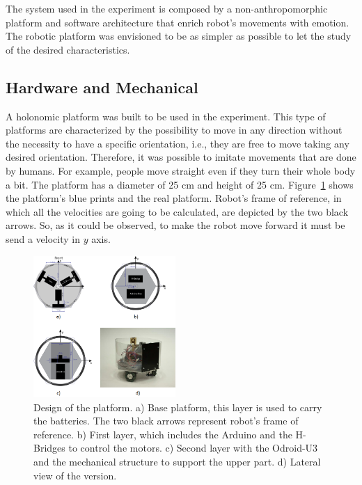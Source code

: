 
The system used in the experiment is composed by a non-anthropomorphic platform and software architecture that enrich robot's movements with emotion. The robotic platform was envisioned to be as simpler as possible to let the study of the desired characteristics. 

\subsection{Hardware and Mechanical}

A holonomic platform was built to be used in the experiment. This type of platforms are characterized by the possibility to move in any direction without the necessity to have a specific orientation, i.e., they are free to move taking any desired orientation. Therefore, it was possible to imitate movements that are done by humans. For example, people move straight even if they turn their whole body a bit. The platform has a diameter of 25 cm and height of 25 cm. Figure~\ref{fig:ThirdDesign} shows the platform's blue prints and the real platform. Robot's frame of reference, in which all the velocities are going to be calculated, are depicted by the two black arrows. So, as it could be observed, to make the robot move forward it must be send a velocity in $y$ axis.

\begin{figure}
	\centering
	\includegraphics[width=0.48\textwidth]{Images/DesignThird.png} 
	\caption{Design of the platform. a) Base platform, this layer is used to carry the batteries. The two black arrows represent robot's frame of reference. b) First layer, which includes the Arduino and the H-Bridges to control the motors. c) Second layer with the Odroid-U3 and the mechanical structure to support the upper part. d) Lateral view of the version.}
	\label{fig:ThirdDesign}
\end{figure}

